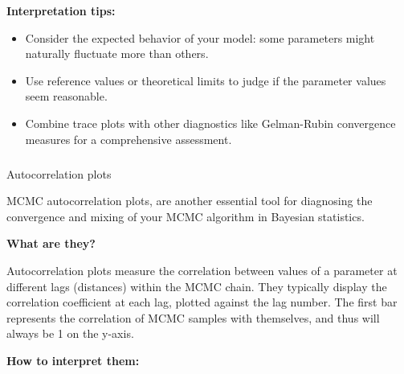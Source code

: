 \documentclass[
  8pt,
  a4paper]{article}
\makeatletter
\let\oldsubparagraph\subparagraph
\renewcommand{\subparagraph}{
    \@ifstar
      \xxxSubParagraphStar
      \xxxSubParagraphNoStar
  }
\newcommand{\xxxSubParagraphStar}[1]{\oldsubparagraph*{#1}\mbox{}}
\newcommand{\xxxSubParagraphNoStar}[1]{\oldsubparagraph{#1}\mbox{}}
\providecommand{\tightlist}{%
  \setlength{\itemsep}{0pt}\setlength{\parskip}{0pt}}
\makeatother
\begin{document}
\textbf{Interpretation tips:}

\begin{itemize}
\tightlist
\item
  Consider the expected behavior of your model: some parameters might
  naturally fluctuate more than others.
\item
  Use reference values or theoretical limits to judge if the parameter
  values seem reasonable.
\item
  Combine trace plots with other diagnostics like Gelman-Rubin
  convergence measures for a comprehensive assessment.
\end{itemize}

\subparagraph{Autocorrelation plots}\label{autocorrelation-plots}

MCMC autocorrelation plots, are another essential tool for diagnosing
the convergence and mixing of your MCMC algorithm in Bayesian
statistics.

\textbf{What are they?}

Autocorrelation plots measure the correlation between values of a
parameter at different lags (distances) within the MCMC chain. They
typically display the correlation coefficient at each lag, plotted
against the lag number. The first bar represents the correlation of MCMC
samples with themselves, and thus will always be 1 on the y-axis.

\textbf{How to interpret them:}
\end{document}
